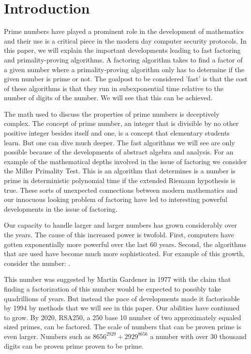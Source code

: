 \documentclass{article}
\begin{document}
\section{Introduction}
Prime numbers have played a prominent role in the development of mathematics and their use is a critical piece in the modern day computer security protocols. In this paper, we will explain the important developments leading to fast factoring and primality-proving algorithms. A factoring algorithm takes to find a factor of a given number where a primality-proving algorithm only has to determine if the given number is prime or not. The goalpost to be considered 'fast' is that the cost of these algorithms is that they run in subexponential time relative to the number of digits of the number.  We will see that this can be achieved. 

The math used to discuss the properties of prime numbers is deceptively complex. The concept of prime number, an integer that is divisible by no other positive integer besides itself and one, is a concept that elementary students learn. But one can dive much deeper. The fast algorithms we will see are only possible because of the developments of abstract algebra and  analysis. For an example of the mathematical depths involved in the issue of factoring we consider the Miller Primality Test. This is an algorithm that determines is a number is prime in deterministic polynomial time if the extended Riemann hypothesis is true. These sorts of unexpected connections between modern mathematics and our innocuous looking problem of factoring have led to interesting powerful developments in the issue of factoring. 

Our capacity to handle larger and larger numbers has grown considerably over the years. The cause of this increased power is twofold. First, computers have gotten exponentially more powerful over the last 60 years. Second, the algorithms that are used have become much more sophisticated. For example of this growth, consider the number: 
.

This number was suggested by Martin Gardener in 1977 with the claim that finding a factorization of this number would be expected to possibly take quadrillions of years\cite{garden}. But instead the pace of developments made it factorisable by 1994 \cite{atkins1994magic} by methods that we will see in this paper.  Our abilities have continued to grow. By 2020, RSA250, a 250 base 10 number of two approximately equaled sized primes, can be factored. The scale of numbers that can be proven prime is even larger. Numbers such as $  8656^{2929} + 2929^{8656}$ a number with over 30 thousand digits can be proven prime proven to be prime. 
\end{document}
